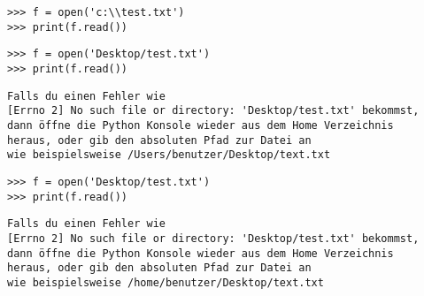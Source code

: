 \begin{WINDOWS}

\begin{Verbatim}[frame=single]
>>> f = open('c:\\test.txt')
>>> print(f.read())
\end{Verbatim}

\end{WINDOWS}

\begin{MAC}

\begin{Verbatim}[frame=single]
>>> f = open('Desktop/test.txt')
>>> print(f.read())
\end{Verbatim}

\begin{Verbatim}[frame=single, label=eventueller Fehler]
Falls du einen Fehler wie
[Errno 2] No such file or directory: 'Desktop/test.txt' bekommst,
dann öffne die Python Konsole wieder aus dem Home Verzeichnis
heraus, oder gib den absoluten Pfad zur Datei an
wie beispielsweise /Users/benutzer/Desktop/text.txt
\end{Verbatim}

\end{MAC}

\begin{LINUX}

\begin{Verbatim}[frame=single]
>>> f = open('Desktop/test.txt')
>>> print(f.read())
\end{Verbatim}

\begin{Verbatim}[frame=single, label=eventueller Fehler]
Falls du einen Fehler wie
[Errno 2] No such file or directory: 'Desktop/test.txt' bekommst,
dann öffne die Python Konsole wieder aus dem Home Verzeichnis
heraus, oder gib den absoluten Pfad zur Datei an
wie beispielsweise /home/benutzer/Desktop/text.txt
\end{Verbatim}

\end{LINUX}

